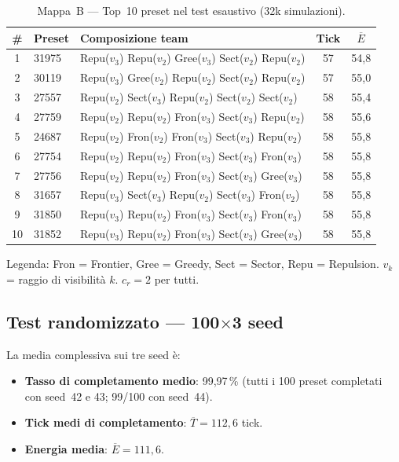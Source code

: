 \begin{table}[H]
\centering
\caption{Mappa~B --- Top~10 preset nel test esaustivo (32k simulazioni).}
\label{tab:B32k-top10}
\small
\begin{tabular}{c l l c c}
\toprule
\textbf{\#} & \textbf{Preset} & \textbf{Composizione team} & \textbf{Tick} & $\overline{E}$ \\
\midrule
1  & 31975 & Repu($v_3$) Repu($v_2$) Gree($v_3$) Sect($v_2$) Repu($v_2$) & 57  & 54{,}8  \\
2  & 30119 & Repu($v_3$) Gree($v_2$) Repu($v_2$) Sect($v_2$) Repu($v_2$) & 57  & 55{,}0  \\
3  & 27557 & Repu($v_2$) Sect($v_3$) Repu($v_2$) Sect($v_2$) Sect($v_2$) & 58  & 55{,}4  \\
4  & 27759 & Repu($v_2$) Repu($v_2$) Fron($v_3$) Sect($v_3$) Repu($v_2$) & 58  & 55{,}6  \\
5  & 24687 & Repu($v_2$) Fron($v_2$) Fron($v_3$) Sect($v_3$) Repu($v_2$) & 58  & 55{,}8  \\
6  & 27754 & Repu($v_2$) Repu($v_2$) Fron($v_3$) Sect($v_3$) Fron($v_3$) & 58  & 55{,}8  \\
7  & 27756 & Repu($v_2$) Repu($v_2$) Fron($v_3$) Sect($v_3$) Gree($v_3$) & 58  & 55{,}8  \\
8  & 31657 & Repu($v_3$) Sect($v_3$) Repu($v_2$) Sect($v_3$) Fron($v_2$) & 58  & 55{,}8  \\
9  & 31850 & Repu($v_3$) Repu($v_2$) Fron($v_3$) Sect($v_3$) Fron($v_3$) & 58  & 55{,}8  \\
10 & 31852 & Repu($v_3$) Repu($v_2$) Fron($v_3$) Sect($v_3$) Gree($v_3$) & 58  & 55{,}8  \\
\bottomrule
\end{tabular}

\vspace{4pt}
{\footnotesize Legenda: Fron = Frontier, Gree = Greedy, Sect = Sector,
Repu = Repulsion. $v_k$ = raggio di visibilit\`a $k$. $c_r = 2$ per tutti.}
\end{table}

\subsection{Test randomizzato --- 100$\times$3 seed}

La media complessiva sui tre seed \`e:

\begin{itemize}
  \item \textbf{Tasso di completamento medio}: 99,97\,\% (tutti i 100 preset completati
        con seed~42 e 43; 99/100 con seed~44).
  \item \textbf{Tick medi di completamento}: $\overline{T} = 112{,}6$ tick.
  \item \textbf{Energia media}: $\overline{E} = 111{,}6$.
\end{itemize}

